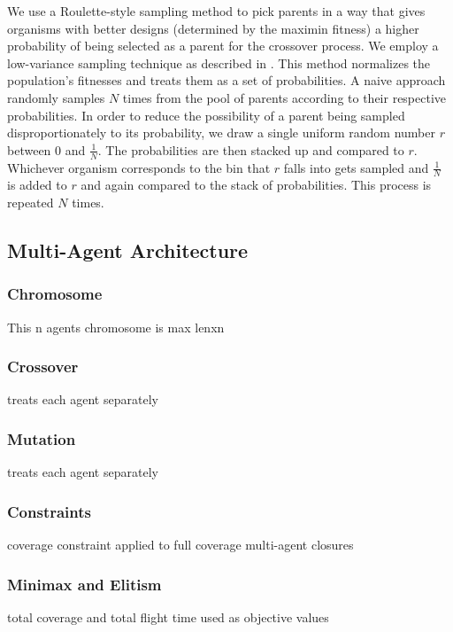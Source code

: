 \documentclass[letterpaper, 10 pt, conference]{ieeeconf}  %
\begin{document}
We use a Roulette-style sampling method to pick parents in a way that gives organisms with better designs (determined by the maximin fitness) a higher probability of being selected as a parent for the crossover process. We employ a low-variance sampling technique as described in \cite{Thrun2006}. This method normalizes the population's fitnesses and treats them as a set of probabilities. A naive approach randomly samples $N$ times from the pool of parents according to their respective probabilities. In order to reduce the possibility of a parent being sampled disproportionately to its probability, we draw a single uniform random number $r$ between 0 and $\tfrac{1}{N}$. The probabilities are then stacked up and compared to $r$. Whichever organism corresponds to the bin that $r$ falls into gets sampled and $\tfrac{1}{N}$ is added to $r$ and again compared to the stack of probabilities. This process is repeated $N$ times.

\subsection{Multi-Agent Architecture}

\subsubsection{Chromosome}
This n agents chromosome is max lenxn

\subsubsection{Crossover}
treats each agent separately

\subsubsection{Mutation}
treats each agent separately

\subsubsection{Constraints}
coverage constraint applied to full coverage
multi-agent closures

\subsubsection{Minimax and Elitism}
total coverage and total flight time used as objective values
\end{document}
